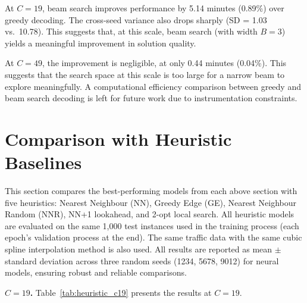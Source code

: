 At $C = 19$, beam search improves performance by 5.14 minutes (0.89\%) over greedy decoding.
The cross-seed variance also drops sharply (SD = 1.03 vs.\ 10.78). This suggests that, at
this scale, beam search (with width $B = 3$) yields a meaningful improvement in solution
quality.

At $C = 49$, the improvement is negligible, at only 0.44 minutes (0.04\%). This suggests
that the search space at this scale is too large for a narrow beam to explore meaningfully.
A computational efficiency comparison between greedy and beam search decoding is left for
future work due to instrumentation constraints.

\section{Comparison with Heuristic Baselines}
\label{sec:heuristic_comparison}

This section compares the best-performing models from each above section with five
heuristics: Nearest Neighbour (NN), Greedy Edge (GE), Nearest Neighbour Random (NNR),
NN+1 lookahead, and 2-opt local search. All heuristic models are evaluated on the same
1,000 test instances used in the training process (each epoch's validation process at the
end). The same traffic data with the same cubic spline interpolation method is also used.
All results are reported as mean $\pm$ standard deviation across three random seeds (1234, 5678, 9012) for neural models, ensuring robust and reliable comparisons.

\textbf{$C = 19$.} Table~\ref{tab:heuristic_c19} presents the results at $C = 19$.

